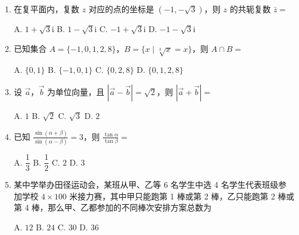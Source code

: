 \documentclass[a4paper,12pt]{ctexart}
\begin{document}
\begin{enumerate}[leftmargin=2em,itemsep=4pt]

\item 在复平面内，复数 $z$ 对应的点的坐标是 $(-1, -\sqrt{3})$，则 $z$ 的共轭复数 $\bar{z} =$

\vspace{1pt}
{\hspace{1.5em} A.\; $1 + \sqrt{3}\mathrm{i}$ \hfill
 B.\; $1 - \sqrt{3}\mathrm{i}$ \hfill
 C.\; $-1 + \sqrt{3}\mathrm{i}$ \hfill
 D.\; $-1 - \sqrt{3}\mathrm{i}$ \hspace{2em}}

\item 已知集合 $A = \{-1, 0, 1, 2, 8\}$，$B = \{x \mid \sqrt[3]{x} = x\}$，则 $A \cap B =$

\vspace{1pt}
{\hspace{1.5em} A.\; $\{0, 1\}$ \hfill
 B.\; $\{-1, 0, 1\}$ \hfill
 C.\; $\{0, 2, 8\}$ \hfill
 D.\; $\{0, 1, 2, 8\}$ \hspace{2em}}

\item 设 $\vec{a}$，$\vec{b}$ 为单位向量，且 $|\vec{a} - \vec{b}| = \sqrt{2}$，则 $|\vec{a} + \vec{b}| =$

\vspace{1pt}
{\hspace{1.5em} A.\; $1$ \hfill
 B.\; $\sqrt{2}$ \hfill
 C.\; $\sqrt{3}$ \hfill
 D.\; $2$ \hspace{2em}}

\item 已知 $\displaystyle\frac{\sin(\alpha+\beta)}{\sin(\alpha-\beta)} = 3$，则 $\displaystyle\frac{\tan\alpha}{\tan\beta} =$

\vspace{1pt}
{\hspace{1.5em} A.\; $\dfrac{1}{3}$ \hfill
 B.\; $\dfrac{1}{2}$ \hfill
 C.\; $2$ \hfill
 D.\; $3$ \hspace{2em}}

\item 某中学举办田径运动会，某班从甲、乙等 6 名学生中选 4 名学生代表班级参加学校 $4 \times 100$ 米接力赛，其中甲只能跑第 1 棒或第 2 棒，乙只能跑第 2 棒或第 4 棒，那么甲、乙都参加的不同棒次安排方案总数为

\vspace{1pt}
{\hspace{1.5em} A.\; $12$ \hfill
 B.\; $24$ \hfill
 C.\; $30$ \hfill
 D.\; $36$ \hspace{2em}}


\end{enumerate}
\end{document}
